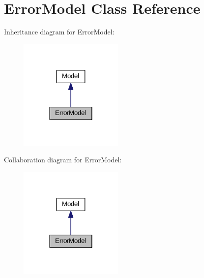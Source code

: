 \hypertarget{classErrorModel}{\section{Error\+Model Class Reference}
\label{classErrorModel}
}


Inheritance diagram for Error\+Model\+:\nopagebreak
\begin{figure}[H]
\begin{center}
\leavevmode
\includegraphics[width=144pt]{classErrorModel__inherit__graph}
\end{center}
\end{figure}


Collaboration diagram for Error\+Model\+:\nopagebreak
\begin{figure}[H]
\begin{center}
\leavevmode
\includegraphics[width=144pt]{classErrorModel__coll__graph}
\end{center}
\end{figure}
